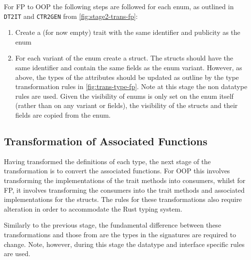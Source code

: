 \documentclass[ oneside,%
                    author={James Elgar},
                    degree={MEng},
                     title={Bidirectional transformer between functional and \\ object-oriented programming in Rust},
                  subtitle={}]{dissertation}
\begin{document}
For FP to OOP the following steps are followed for each enum, as outlined in \verb|DT2IT| and \verb|CTR2GEN| from \autoref{fig:stage2-trans-fp}:
\begin{enumerate}
    \item Create a (for now empty) trait with the same identifier and publicity as the enum  
    \item For each variant of the enum create a struct. The structs should have the same identifier and contain the same fields as the enum variant.
    However, as above, the types of the attributes should be updated as outline by the type transformation rules in \autoref{fig:trans-type-fp}. Note at this stage the non datatype rules are used.
    Given the visibility of enums is only set on the enum itself (rather than on any variant or fields), the visibility of the structs and their fields are copied from the enum.
\end{enumerate}

\subsection{Transformation of Associated Functions}

Having transformed the definitions of each type, the next stage of the transformation is to convert the associated functions. For OOP this involves transforming the implementations of the trait methods into consumers, whilst for FP, it involves transforming the consumers into the trait methods and associated implementations for the structs. The rules for these transformations also require alteration in order to accommodate the Rust typing system.

Similarly to the previous stage, the fundamental difference between these transformations and those from \cite{food} are the types in the signatures are required to change. Note, however, during this stage the datatype and interface specific rules are used. 

\end{document}

